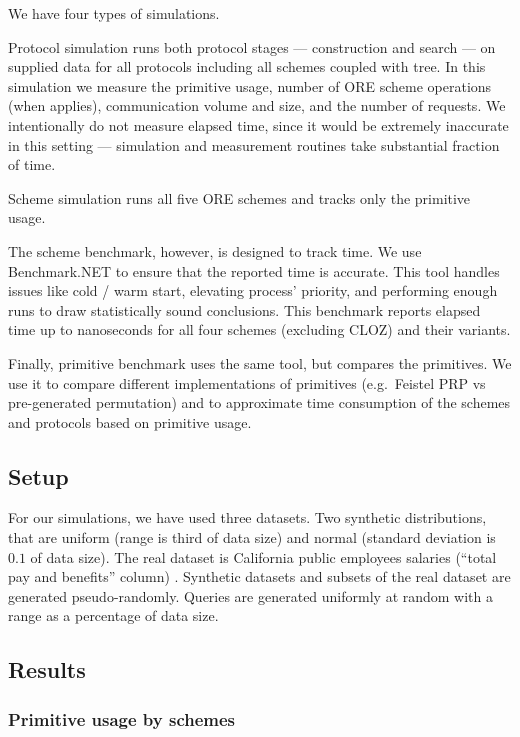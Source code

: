 			

			We have four types of simulations.

			Protocol simulation runs both protocol stages --- construction and search --- on supplied data for all protocols including all schemes coupled with {\BPlus} tree.
			In this simulation we measure the primitive usage, number of ORE scheme operations (when applies), communication volume and size, and the number of {\IO} requests.
			We intentionally do not measure elapsed time, since it would be extremely inaccurate in this setting --- simulation and measurement routines take substantial fraction of time.

			Scheme simulation runs all five ORE schemes and tracks only the primitive usage.

			The scheme benchmark, however, is designed to track time.
			We use Benchmark.NET \cite{benchmark-net} to ensure that the reported time is accurate.
			This tool handles issues like cold / warm start, elevating process' priority, and performing enough runs to draw statistically sound conclusions.
			This benchmark reports elapsed time up to nanoseconds for all four schemes (excluding CLOZ) and their variants.

			Finally, primitive benchmark uses the same tool, but compares the primitives.
			We use it to compare different implementations of primitives (e.g.\ Feistel PRP vs pre-generated permutation) and to approximate time consumption of the schemes and protocols based on primitive usage.

	\subsection{Setup}

		For our simulations, we have used three datasets.
		Two synthetic distributions, that are uniform (range is third of data size) and normal (standard deviation is $0.1$ of data size).
		The real dataset is California public employees salaries (``total pay and benefits'' column) \cite{ca-dataset}.
		Synthetic datasets and subsets of the real dataset are generated pseudo\hyp{}randomly.
		Queries are generated uniformly at random with a range as a percentage of data size.

	\subsection{Results}

		\subsubsection{Primitive usage by schemes}\label{section:range-snapshot:schemes-primitive-usage}

